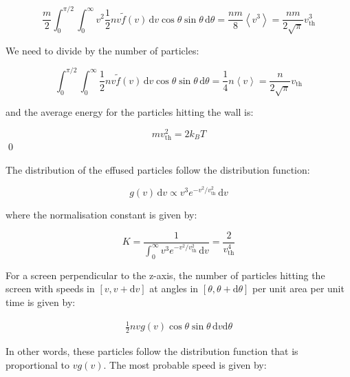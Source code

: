 \documentclass[12pt]{article}
\begin{document}
\begin{equation}
    \frac{m}{2} \int_{0}^{\pi/2} \int_{0}^{\infty} v^{2} \frac{1}{2} nv \tilde{f}(v) \, \mathrm{d}v \cos{\theta} \sin{\theta} \, \mathrm{d}\theta = \frac{nm}{8} \left\langle v^{3} \right\rangle = \frac{nm}{2\sqrt{\pi}} v_{\text{th}}^{3}
\end{equation}

We need to divide by the number of particles:

\begin{equation}
    \int_{0}^{\pi/2} \int_{0}^{\infty} \frac{1}{2} nv \tilde{f}(v) \, \mathrm{d}v \cos{\theta} \sin{\theta} \, \mathrm{d}\theta = \frac{1}{4} n \left\langle v \right\rangle = \frac{n}{2\sqrt{\pi}} v_{\text{th}}
\end{equation}

and the average energy for the particles hitting the wall is:

\begin{equation}
    mv_{\text{th}}^{2} = 2k_{B} T
\end{equation}
\qed



The distribution of the effused particles follow the distribution function:

\begin{equation}
    g(v) \, \mathrm{d}v \propto v^{3} e^{-v^{2}/v_{\text{th}}^{2}} \, \mathrm{d}v
\end{equation}

where the normalisation constant is given by:

\begin{equation}
    K = \frac{1}{\int_{0}^{\infty} v^{3} e^{-v^{2}/v_{\text{th}}^{2}} \, \mathrm{d}v} = \frac{2}{v_{\text{th}}^{4}}
\end{equation}

For a screen perpendicular to the z-axis, the number of particles hitting the screen with speeds in $[v, v + \mathrm{d}v]$ at angles in $[\theta, \theta + \mathrm{d}\theta]$ per unit area per unit time is given by:

\begin{equation}
    \begin{split}
        \frac{1}{2} nv g(v) \cos{\theta} \sin{\theta} \, \mathrm{d}v \mathrm{d}\theta
    \end{split}
\end{equation}

In other words, these particles follow the distribution function that is proportional to $v g(v)$. The most probable speed is given by:
\end{document}
